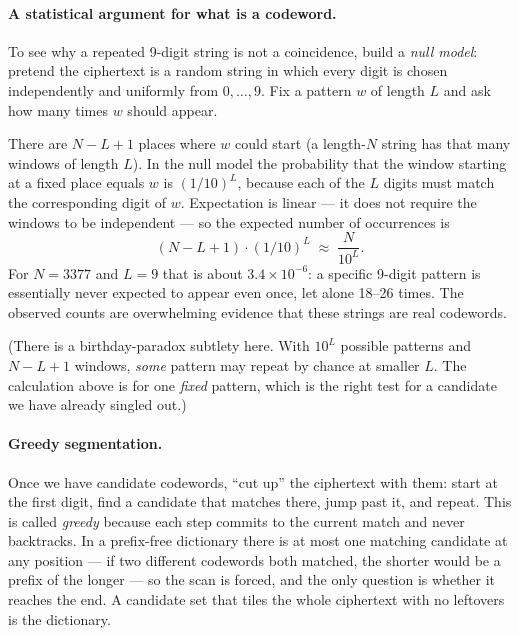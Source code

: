 \documentclass[11pt]{article}
\begin{document}
\paragraph{A statistical argument for what is a codeword.}  To see why a
repeated 9-digit string is not a coincidence, build a \emph{null model}:
pretend the ciphertext is a random string in which every digit is chosen
independently and uniformly from $0,\dots,9$.  Fix a pattern $w$ of length $L$
and ask how many times $w$ should appear.

There are $N-L+1$ places where $w$ could start (a length-$N$ string has that
many windows of length $L$).  In the null model the probability that the
window starting at a fixed place equals $w$ is $(1/10)^L$, because each of the
$L$ digits must match the corresponding digit of $w$.  Expectation is linear
--- it does not require the windows to be independent --- so the expected
number of occurrences is
\[
(N-L+1)\cdot(1/10)^L \;\approx\; \frac{N}{10^L}.
\]
For $N=3377$ and $L=9$ that is about $3.4\times10^{-6}$: a specific 9-digit
pattern is essentially never expected to appear even once, let alone 18--26
times.  The observed counts are overwhelming evidence that these strings are
real codewords.

(There is a birthday-paradox subtlety here.  With $10^L$ possible patterns and
$N-L+1$ windows, \emph{some} pattern may repeat by chance at smaller $L$.  The
calculation above is for one \emph{fixed} pattern, which is the right test for
a candidate we have already singled out.)

\paragraph{Greedy segmentation.}  Once we have candidate codewords, ``cut up''
the ciphertext with them: start at the first digit, find a candidate that
matches there, jump past it, and repeat.  This is called \emph{greedy} because
each step commits to the current match and never backtracks.  In a prefix-free
dictionary there is at most one matching candidate at any position --- if two
different codewords both matched, the shorter would be a prefix of the longer
--- so the scan is forced, and the only question is whether it reaches the
end.  A candidate set that tiles the whole ciphertext with no leftovers is the
dictionary.
\end{document}
